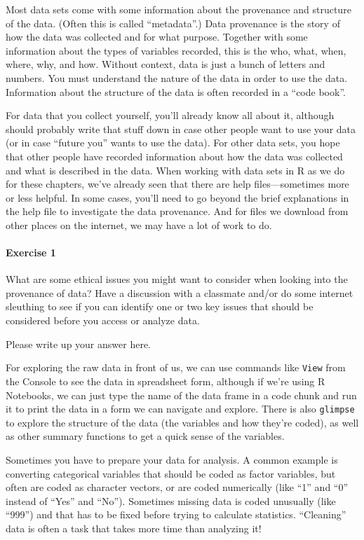\documentclass[
]{book}
\begin{document}
Most data sets come with some information about the provenance and structure of the data. (Often this is called ``metadata''.) Data provenance is the story of how the data was collected and for what purpose. Together with some information about the types of variables recorded, this is the who, what, when, where, why, and how. Without context, data is just a bunch of letters and numbers. You must understand the nature of the data in order to use the data. Information about the structure of the data is often recorded in a ``code book''.

For data that you collect yourself, you'll already know all about it, although should probably write that stuff down in case other people want to use your data (or in case ``future you'' wants to use the data). For other data sets, you hope that other people have recorded information about how the data was collected and what is described in the data. When working with data sets in R as we do for these chapters, we've already seen that there are help files---sometimes more or less helpful. In some cases, you'll need to go beyond the brief explanations in the help file to investigate the data provenance. And for files we download from other places on the internet, we may have a lot of work to do.

\hypertarget{exercise-1-7}{%
\paragraph*{Exercise 1}\label{exercise-1-7}}

What are some ethical issues you might want to consider when looking into the provenance of data? Have a discussion with a classmate and/or do some internet sleuthing to see if you can identify one or two key issues that should be considered before you access or analyze data.

Please write up your answer here.

For exploring the raw data in front of us, we can use commands like \texttt{View} from the Console to see the data in spreadsheet form, although if we're using R Notebooks, we can just type the name of the data frame in a code chunk and run it to print the data in a form we can navigate and explore. There is also \texttt{glimpse} to explore the structure of the data (the variables and how they're coded), as well as other summary functions to get a quick sense of the variables.

Sometimes you have to prepare your data for analysis. A common example is converting categorical variables that should be coded as factor variables, but often are coded as character vectors, or are coded numerically (like ``1'' and ``0'' instead of ``Yes'' and ``No''). Sometimes missing data is coded unusually (like ``999'') and that has to be fixed before trying to calculate statistics. ``Cleaning'' data is often a task that takes more time than analyzing it!
\end{document}
